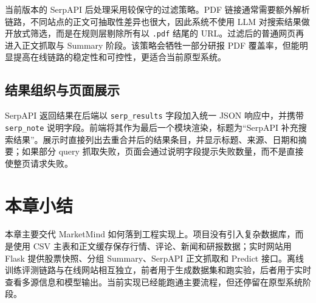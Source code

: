 当前版本的 SerpAPI 后处理采用较保守的过滤策略。PDF 链接通常需要额外解析链路，不同站点的正文可抽取性差异也很大，因此系统不使用 LLM 对搜索结果做开放式筛选，而是在规则层剔除所有以 \texttt{.pdf} 结尾的 URL。过滤后的普通网页再进入正文抓取与 Summary 阶段。该策略会牺牲一部分研报 PDF 覆盖率，但能明显提高在线链路的稳定性和可控性，更适合当前原型系统。

\subsection{结果组织与页面展示}

SerpAPI 返回结果在后端以 \texttt{serp\_results} 字段加入统一 JSON 响应中，并携带 \texttt{serp\_note} 说明字段。前端将其作为最后一个模块渲染，标题为“SerpAPI 补充搜索结果”。展示时直接列出去重合并后的结果条目，并显示标题、来源、日期和摘要；如果部分 query 抓取失败，页面会通过说明字段提示失败数量，而不是直接使整页请求失败。

\section{本章小结}

本章主要交代 MarketMind 如何落到工程实现上。项目没有引入复杂数据库，而是使用 CSV 主表和正文缓存保存行情、评论、新闻和研报数据；实时网站用 Flask 提供股票快照、分组 Summary、SerpAPI 正文抓取和 Predict 接口。离线训练评测链路与在线网站相互独立，前者用于生成数据集和跑实验，后者用于实时查看多源信息和模型输出。当前实现已经能跑通主要流程，但还停留在原型系统阶段。
